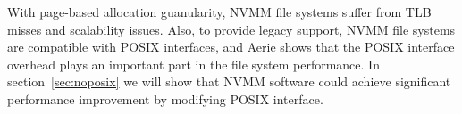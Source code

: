 With page-based allocation guanularity, NVMM file systems suffer from 
TLB misses and scalability issues. Also, to provide legacy support,
NVMM file systems are compatible with POSIX interfaces, and Aerie shows that the
POSIX interface overhead plays an important part in the file system
performance. In section~\ref{sec:noposix} we will show that NVMM software
could achieve significant performance improvement by modifying POSIX interface. 
 

